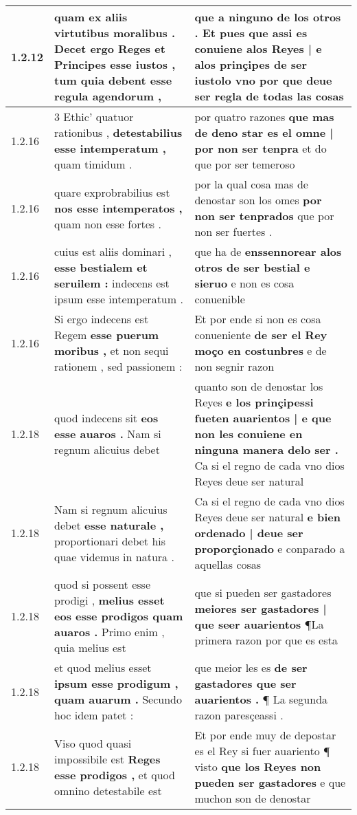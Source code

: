 \begin{tabular}{|p{1cm}|p{6.5cm}|p{6.5cm}|}
1.2.12 & quam ex aliis virtutibus moralibus . \textbf{ Decet ergo Reges et Principes esse iustos , } tum quia debent esse regula agendorum , & que a ninguno de los otros . \textbf{ Et pues que assi es conuiene alos Reyes | e alos prinçipes de ser iustolo vno } por que deue ser regla de todas las cosas \\\hline
1.2.16 & 3 Ethic’ quatuor rationibus , \textbf{ detestabilius esse intemperatum , } quam timidum . & por quatro razones \textbf{ que mas de deno star es el omne | por non ser tenpra } et do que por ser temeroso \\\hline
1.2.16 & quare exprobrabilius est \textbf{ nos esse intemperatos , } quam non esse fortes . & por la qual cosa mas de denostar son los omes \textbf{ por non ser tenprados } que por non ser fuertes . \\\hline
1.2.16 & cuius est aliis dominari , \textbf{ esse bestialem et seruilem : } indecens est ipsum esse intemperatum . & que ha de \textbf{ enssennorear alos otros de ser bestial e sieruo } e non es cosa conuenible \\\hline
1.2.16 & Si ergo indecens est Regem \textbf{ esse puerum moribus , } et non sequi rationem , sed passionem : & Et por ende si non es cosa conueniente \textbf{ de ser el Rey moço en costunbres } e de non segnir razon \\\hline
1.2.18 & quod indecens sit \textbf{ eos esse auaros . } Nam si regnum alicuius debet & quanto son de denostar los Reyes \textbf{ e los prinçipessi fueten auarientos | e que non les conuiene en ninguna manera delo ser . } Ca si el regno de cada vno dios Reyes deue ser natural \\\hline
1.2.18 & Nam si regnum alicuius debet \textbf{ esse naturale , } proportionari debet his quae videmus in natura . & Ca si el regno de cada vno dios Reyes deue ser natural \textbf{ e bien ordenado | deue ser proporçionado } e conparado a aquellas cosas \\\hline
1.2.18 & quod si possent esse prodigi , \textbf{ melius esset eos esse prodigos quam auaros . } Primo enim , quia melius est & que si pueden ser gastadores \textbf{ meiores ser gastadores | que seer auarientos } ¶La primera razon por que es esta \\\hline
1.2.18 & et quod melius esset \textbf{ ipsum esse prodigum , quam auarum . } Secundo hoc idem patet : & que meior les es \textbf{ de ser gastadores que ser auarientos . } ¶ La segunda razon paresçeassi . \\\hline
1.2.18 & Viso quod quasi impossibile est \textbf{ Reges esse prodigos , } et quod omnino detestabile est & Et por ende muy de depostar es el Rey si fuer auariento ¶ visto \textbf{ que los Reyes non pueden ser gastadores } e que muchon son de denostar \\\hline

\end{tabular}
